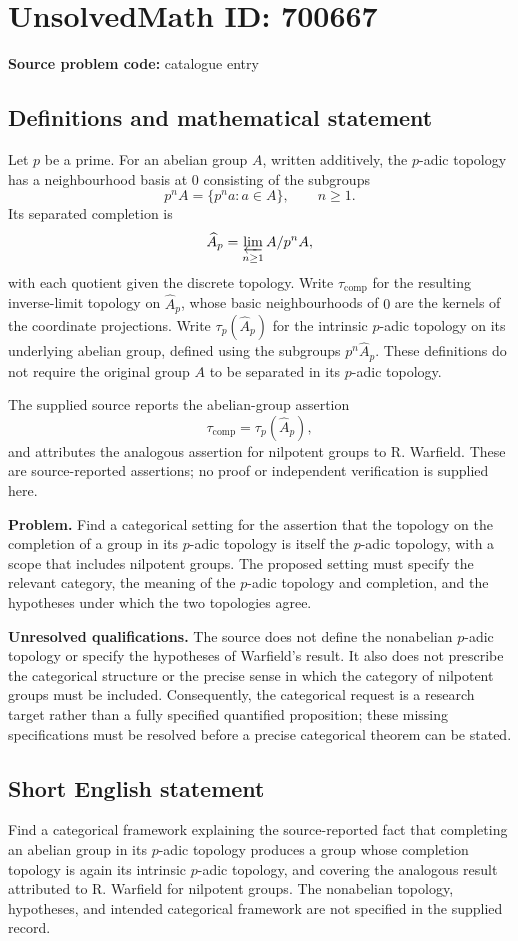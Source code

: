 \documentclass[11pt]{article}
\begin{document}
\section*{UnsolvedMath ID: 700667}
\textbf{Source problem code:} catalogue entry
\subsection{Definitions and mathematical statement}
Let \(p\) be a prime. For an abelian group \(A\), written additively, the \(p\)-adic topology has a neighbourhood basis at \(0\) consisting of the subgroups
\[
p^nA=\{p^na:a\in A\},\qquad n\geq 1.
\]
Its separated completion is
\[
\widehat A_p=\varprojlim_{n\geq 1} A/p^nA,
\]
with each quotient given the discrete topology. Write \(\tau_{\mathrm{comp}}\) for the resulting inverse-limit topology on \(\widehat A_p\), whose basic neighbourhoods of \(0\) are the kernels of the coordinate projections. Write \(\tau_p(\widehat A_p)\) for the intrinsic \(p\)-adic topology on its underlying abelian group, defined using the subgroups \(p^n\widehat A_p\). These definitions do not require the original group \(A\) to be separated in its \(p\)-adic topology.

The supplied source reports the abelian-group assertion
\[
\tau_{\mathrm{comp}}=\tau_p(\widehat A_p),
\]
and attributes the analogous assertion for nilpotent groups to R. Warfield. These are source-reported assertions; no proof or independent verification is supplied here.

\textbf{Problem.} Find a categorical setting for the assertion that the topology on the completion of a group in its \(p\)-adic topology is itself the \(p\)-adic topology, with a scope that includes nilpotent groups. The proposed setting must specify the relevant category, the meaning of the \(p\)-adic topology and completion, and the hypotheses under which the two topologies agree.

\textbf{Unresolved qualifications.} The source does not define the nonabelian \(p\)-adic topology or specify the hypotheses of Warfield's result. It also does not prescribe the categorical structure or the precise sense in which the category of nilpotent groups must be included. Consequently, the categorical request is a research target rather than a fully specified quantified proposition; these missing specifications must be resolved before a precise categorical theorem can be stated.
\subsection{Short English statement}
Find a categorical framework explaining the source-reported fact that completing an abelian group in its \(p\)-adic topology produces a group whose completion topology is again its intrinsic \(p\)-adic topology, and covering the analogous result attributed to R. Warfield for nilpotent groups. The nonabelian topology, hypotheses, and intended categorical framework are not specified in the supplied record.
\end{document}
